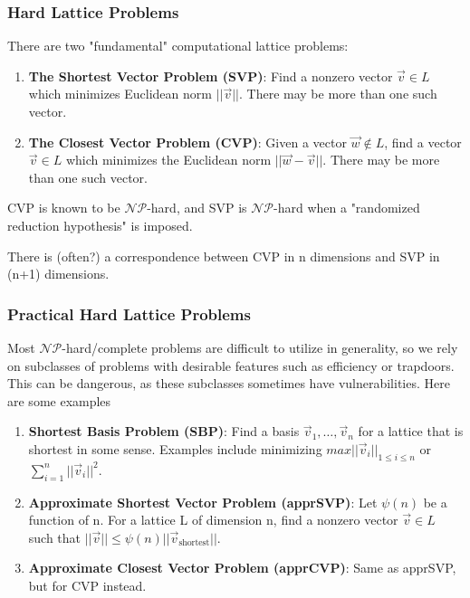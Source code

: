 \documentclass[10pt,a4paper]{article}
\theoremstyle{remark}
\begin{document}
\subsubsection{Hard Lattice Problems}
There are two "fundamental" computational lattice problems:
\begin{enumerate}
\item \textbf{The Shortest Vector Problem (SVP)}: Find a nonzero vector $\vec{v}\in L$ which minimizes Euclidean norm $\vert\vert\vec{v}\vert\vert$. There may be more than one such vector.
\item \textbf{The Closest Vector Problem (CVP)}: Given a vector $\vec{w}\notin L$, find a vector $\vec{v}\in L$ which minimizes the Euclidean norm $\vert\vert \vec{w}-\vec{v}\vert\vert$. There may be more than one such vector.
\end{enumerate}
CVP is known to be $\mathcal{NP}$-hard, and SVP is $\mathcal{NP}$-hard when a "randomized reduction hypothesis" is imposed.

There is (often?) a correspondence between CVP in n dimensions and SVP in (n+1) dimensions.

\subsubsection{Practical Hard Lattice Problems}
Most $\mathcal{NP}$-hard/complete problems are difficult to utilize in generality, so we rely on subclasses of problems with desirable features such as efficiency or trapdoors. This can be dangerous, as these subclasses sometimes have vulnerabilities. Here are some examples
\begin{enumerate}
\item \textbf{Shortest Basis Problem (SBP)}: Find a basis $\vec{v}_1,\ldots,\vec{v}_n$ for a lattice that is shortest in some sense. Examples include minimizing $max\vert\vert \vec{v}_i\vert\vert_{1\leq i\leq n}$ or $\sum_{i=1}^n \vert\vert\vec{v}_i\vert\vert^2$.
\item \textbf{Approximate Shortest Vector Problem (apprSVP)}: Let $\psi(n)$ be a function of n. For a lattice L of dimension n, find a nonzero vector $\vec{v}\in L$ such that $\vert\vert \vec{v}\vert\vert \leq \psi(n)\vert\vert\vec{v}_{\text{shortest}}\vert\vert$.
\item \textbf{Approximate Closest Vector Problem (apprCVP)}: Same as apprSVP, but for CVP instead.
\end{enumerate}
\end{document}
